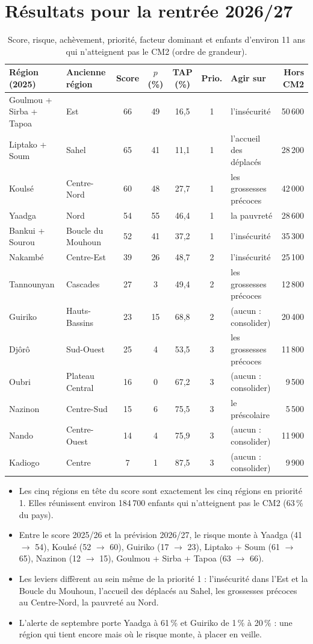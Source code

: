 \documentclass[11pt,a4paper]{article}
\begin{document}
\section{Résultats pour la rentrée 2026/27}
\begin{table}[H]\centering\footnotesize
\begin{tabularx}{\textwidth}{@{}>{\raggedright}p{2.7cm}>{\raggedright}p{2.1cm}cccc>{\raggedright}Xr@{}}\toprule
Région (2025) & Ancienne région & Score & $p$ (\%) & TAP (\%) & Prio. & Agir sur & Hors CM2\tabularnewline\midrule
Goulmou + Sirba + Tapoa & Est & 66 & 49 & 16{,}5 & 1 & l'insécurité & 50\,600 \tabularnewline
Liptako + Soum & Sahel & 65 & 41 & 11{,}1 & 1 & l'accueil des déplacés & 28\,200 \tabularnewline
Koulsé & Centre-Nord & 60 & 48 & 27{,}7 & 1 & les grossesses précoces & 42\,000 \tabularnewline
Yaadga & Nord & 54 & 55 & 46{,}4 & 1 & la pauvreté & 28\,600 \tabularnewline
Bankui + Sourou & Boucle du Mouhoun & 52 & 41 & 37{,}2 & 1 & l'insécurité & 35\,300 \tabularnewline
Nakambé & Centre-Est & 39 & 26 & 48{,}7 & 2 & l'insécurité & 25\,100 \tabularnewline
Tannounyan & Cascades & 27 & 3 & 49{,}4 & 2 & les grossesses précoces & 12\,800 \tabularnewline
Guiriko & Hauts-Bassins & 23 & 15 & 68{,}8 & 2 & (aucun : consolider) & 20\,400 \tabularnewline
Djôrô & Sud-Ouest & 25 & 4 & 53{,}5 & 3 & les grossesses précoces & 11\,800 \tabularnewline
Oubri & Plateau Central & 16 & 0 & 67{,}2 & 3 & (aucun : consolider) & 9\,500 \tabularnewline
Nazinon & Centre-Sud & 15 & 6 & 75{,}5 & 3 & le préscolaire & 5\,500 \tabularnewline
Nando & Centre-Ouest & 14 & 4 & 75{,}9 & 3 & (aucun : consolider) & 11\,900 \tabularnewline
Kadiogo & Centre & 7 & 1 & 87{,}5 & 3 & (aucun : consolider) & 9\,900 \tabularnewline
\bottomrule
\end{tabularx}\caption{Score, risque, achèvement, priorité, facteur dominant et enfants d'environ 11 ans qui n'atteignent pas le CM2 (ordre de grandeur).}\end{table}
\begin{itemize}
\item Les cinq régions en tête du score sont exactement les cinq régions en priorité 1. Elles réunissent environ 184\,700 enfants qui n'atteignent pas le CM2 (63\,\% du pays).
\item Entre le score 2025/26 et la prévision 2026/27, le risque monte à Yaadga (41 $\to$ 54), Koulsé (52 $\to$ 60), Guiriko (17 $\to$ 23), Liptako + Soum (61 $\to$ 65), Nazinon (12 $\to$ 15), Goulmou + Sirba + Tapoa (63 $\to$ 66).
\item Les leviers diffèrent au sein même de la priorité 1 : l'insécurité dans l'Est et la Boucle du Mouhoun, l'accueil des déplacés au Sahel, les grossesses précoces au Centre-Nord, la pauvreté au Nord.
\item L'alerte de septembre porte Yaadga à 61\,\% et Guiriko de 1\,\% à 20\,\% : une région qui tient encore mais où le risque monte, à placer en veille.
\end{itemize}
\end{document}
